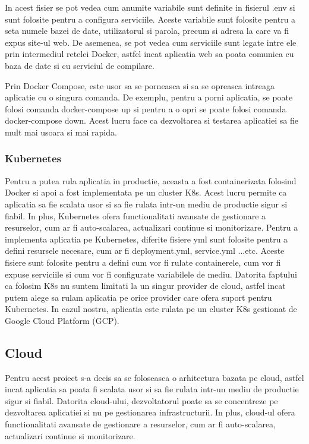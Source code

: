 \documentclass[titlepage,12pt]{article}
\DeclareRobustCommand{\code}[1]{{\ttfamily\small #1}}
\begin{document}
In acest fisier se pot vedea cum anumite variabile sunt definite in fisierul \code{.env} si sunt folosite pentru a configura serviciile. Aceste variabile sunt folosite pentru a seta numele bazei de date, utilizatorul si parola, precum si adresa la care va fi expus site-ul web. De asemenea, se pot vedea cum serviciile sunt legate intre ele prin intermediul retelei Docker, astfel incat aplicatia web sa poata comunica cu baza de date si cu serviciul de compilare.

Prin Docker Compose, este usor sa se porneasca si sa se opreasca intreaga aplicatie cu o singura comanda. De exemplu, pentru a porni aplicatia, se poate folosi comanda \code{docker-compose up} si pentru a o opri se poate folosi comanda \code{docker-compose down}. Acest lucru face ca dezvoltarea si testarea aplicatiei sa fie mult mai usoara si mai rapida.

\subsubsection{Kubernetes}
Pentru a putea rula aplicatia in productie, aceasta a fost containerizata folosind Docker si apoi a fost implementata pe un cluster \ac {K8s}. Acest lucru permite ca aplicatia sa fie scalata usor si sa fie rulata intr-un mediu de productie sigur si fiabil. In plus, Kubernetes ofera functionalitati avansate de gestionare a resurselor, cum ar fi auto-scalarea, actualizari continue si monitorizare.
Pentru a implementa aplicatia pe Kubernetes, diferite fisiere \code{yml} sunt folosite pentru a defini resursele necesare, cum ar fi \code{deployment.yml}, \code{service.yml} ...etc. Aceste fisiere sunt folosite pentru a defini cum vor fi rulate containerele, cum vor fi expuse serviciile si cum vor fi configurate variabilele de mediu.
Datorita faptului ca folosim \ac {K8s} nu suntem limitati la un singur provider de cloud, astfel incat putem alege sa rulam aplicatia pe orice provider care ofera suport pentru Kubernetes. In cazul nostru, aplicatia este rulata pe un cluster \ac {K8s} gestionat de Google Cloud Platform (GCP).

\subsection{Cloud}
Pentru acest proiect s-a decis sa se foloseasca o arhitectura bazata pe cloud, astfel incat aplicatia sa poata fi scalata usor si sa fie rulata intr-un mediu de productie sigur si fiabil. Datorita cloud-ului, dezvoltatorul poate sa se concentreze pe dezvoltarea aplicatiei si nu pe gestionarea infrastructurii. In plus, cloud-ul ofera functionalitati avansate de gestionare a resurselor, cum ar fi auto-scalarea, actualizari continue si monitorizare.
\end{document}
